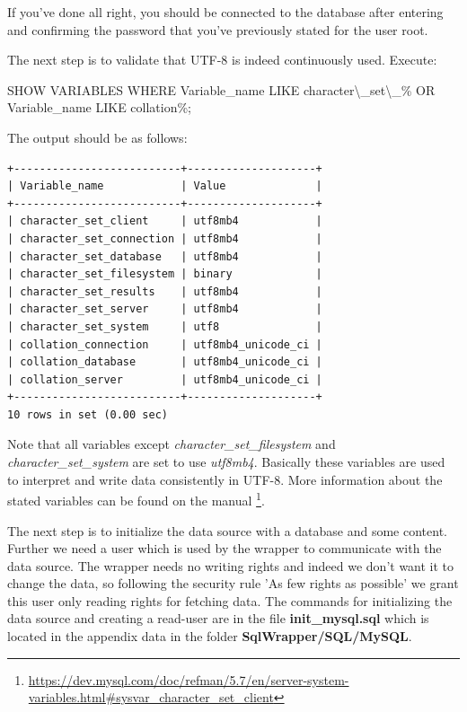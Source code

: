 If you've done all right, you should be connected to the database after entering and confirming the password that you've previously stated for the user root.

The next step is to validate that UTF-8 is indeed continuously used. Execute:

\begin{codebox}
	SHOW VARIABLES WHERE Variable\_name LIKE \textquotesingle{}character\textbackslash\_set\textbackslash\_\%\textquotesingle{} OR Variable\_name LIKE \textquotesingle{}collation\%\textquotesingle{};
\end{codebox}


The output should be as follows:

\begin{lstlisting}[style=RdfCodeStyle, caption=Expected character set output, label=MySQLCharacterTest]
+--------------------------+--------------------+
| Variable_name            | Value              |
+--------------------------+--------------------+
| character_set_client     | utf8mb4            |
| character_set_connection | utf8mb4            |
| character_set_database   | utf8mb4            |
| character_set_filesystem | binary             |
| character_set_results    | utf8mb4            |
| character_set_server     | utf8mb4            |
| character_set_system     | utf8               |
| collation_connection     | utf8mb4_unicode_ci |
| collation_database       | utf8mb4_unicode_ci |
| collation_server         | utf8mb4_unicode_ci |
+--------------------------+--------------------+
10 rows in set (0.00 sec)
\end{lstlisting}
Note that all variables except \emph{character\_set\_filesystem} and \emph{character\_set\_system} are set to use \emph{utf8mb4}.
Basically these variables are used to interpret and write data consistently in UTF-8. More information about the stated variables can be found on the manual
\footnote{\url{https://dev.mysql.com/doc/refman/5.7/en/server-system-variables.html\#sysvar_character_set_client}}.

The next step is to initialize the data source with a database and some content. Further we need a user which is used by the wrapper to communicate with the data source. The wrapper needs no writing rights and indeed we don't want it to change the data, so following the security rule 'As few rights as possible' we grant this user only reading rights for fetching data. The commands for initializing the data source and creating a read-user are in the file \textbf{init\_mysql.sql} which is located in the appendix data in the folder \textbf{SqlWrapper/SQL/MySQL}.

